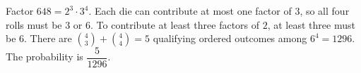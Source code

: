 Factor $648=2^3\cdot3^4$. Each die can contribute at most one factor of $3$, so all four rolls must be $3$ or $6$. To contribute at least three factors of $2$, at least three must be $6$. There are $\binom43+\binom44=5$ qualifying ordered outcomes among $6^4=1296$. The probability is $\boxed{\dfrac{5}{1296}}$.
